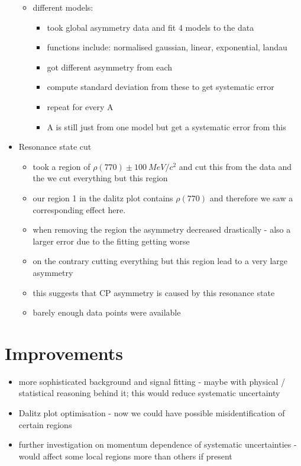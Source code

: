 \documentclass[10pt]{article}
\begin{document}
\begin{itemize}
\begin{itemize}
\begin{itemize}
\end{itemize}
\item different models:
\begin{itemize}
\item took global asymmetry data and fit 4 models to the data
\item functions include: normalised gaussian, linear, exponential, landau
\item got different asymmetry from each
\item compute standard deviation from these  to get systematic error
\item repeat for every A
\item A is still just from one model but get a systematic error from this
\end{itemize}
\end{itemize}
\item{Resonance state cut}
\begin{itemize}
\item took a region of $\rho(770) \pm 100~MeV/c^2$ and cut this from the data and the we cut everything but this region
\item our region 1 in the dalitz plot contains $\rho(770)$ and therefore we saw a corresponding effect here.
\item when removing the region the asymmetry decreased drastically - also a larger error due to the fitting getting worse
\item on the contrary cutting everything but this region lead to a very large asymmetry
\item this suggests that CP asymmetry is caused by this resonance state
\item barely enough data points were available
\end{itemize}
\end{itemize}

\section{Improvements}
\begin{itemize}
\item more sophisticated background and signal fitting - maybe with physical / statistical reasoning behind it; this would reduce systematic uncertainty
\item Dalitz plot optimisation - now we could have possible misidentification of certain regions
\item further investigation on momentum dependence of systematic uncertainties - would affect some local regions more than others if present
\end{itemize}
\end{document}

